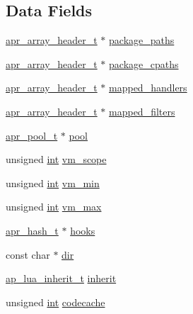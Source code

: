 \subsection*{Data Fields}
\begin{DoxyCompactItemize}
\item 
\hyperlink{structapr__array__header__t}{apr\+\_\+array\+\_\+header\+\_\+t} $\ast$ \hyperlink{structap__lua__dir__cfg_a4891c136950ab7bc143ce0ad4ee734a5}{package\+\_\+paths}
\item 
\hyperlink{structapr__array__header__t}{apr\+\_\+array\+\_\+header\+\_\+t} $\ast$ \hyperlink{structap__lua__dir__cfg_a6a418a32620e9ae533abe74bb9b1c3a2}{package\+\_\+cpaths}
\item 
\hyperlink{structapr__array__header__t}{apr\+\_\+array\+\_\+header\+\_\+t} $\ast$ \hyperlink{structap__lua__dir__cfg_aa8fd92d93db492bce8683a1a129ecec7}{mapped\+\_\+handlers}
\item 
\hyperlink{structapr__array__header__t}{apr\+\_\+array\+\_\+header\+\_\+t} $\ast$ \hyperlink{structap__lua__dir__cfg_ae3e48eb5ef75261cd9b480ecc846b293}{mapped\+\_\+filters}
\item 
\hyperlink{structapr__pool__t}{apr\+\_\+pool\+\_\+t} $\ast$ \hyperlink{structap__lua__dir__cfg_ab8944c4e84619d11aa552302c6511a2b}{pool}
\item 
unsigned \hyperlink{pcre_8txt_a42dfa4ff673c82d8efe7144098fbc198}{int} \hyperlink{structap__lua__dir__cfg_af55cc562922b589ae58c1a5ddeba14dc}{vm\+\_\+scope}
\item 
unsigned \hyperlink{pcre_8txt_a42dfa4ff673c82d8efe7144098fbc198}{int} \hyperlink{structap__lua__dir__cfg_a60cc6a8b476384e3adb941ef9feb1d9f}{vm\+\_\+min}
\item 
unsigned \hyperlink{pcre_8txt_a42dfa4ff673c82d8efe7144098fbc198}{int} \hyperlink{structap__lua__dir__cfg_a8888cae331d4fd4e8aa449f9f52e6c72}{vm\+\_\+max}
\item 
\hyperlink{structapr__hash__t}{apr\+\_\+hash\+\_\+t} $\ast$ \hyperlink{structap__lua__dir__cfg_a1683bb0939829aaf8be5cdc25d11164a}{hooks}
\item 
const char $\ast$ \hyperlink{structap__lua__dir__cfg_ae1763f6ce413e6b5a0b940df8e5042c7}{dir}
\item 
\hyperlink{mod__lua_8h_a9cdbb4e1c34c4088a382c69c90793d35}{ap\+\_\+lua\+\_\+inherit\+\_\+t} \hyperlink{structap__lua__dir__cfg_a97850405eaaba0497bf0aa119d6a57f4}{inherit}
\item 
unsigned \hyperlink{pcre_8txt_a42dfa4ff673c82d8efe7144098fbc198}{int} \hyperlink{structap__lua__dir__cfg_a637a5ba5da558290834436543fcdc971}{codecache}
\end{DoxyCompactItemize}


